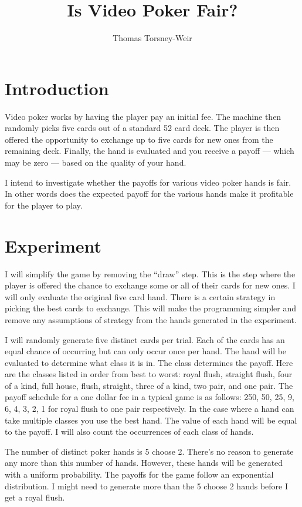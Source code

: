 \documentclass{article}
\author{Thomas Torsney-Weir}
\title{Is Video Poker Fair?}
\begin{document}
\maketitle

\section{Introduction}
Video poker works by having the player pay an initial fee.  The machine then
randomly picks five cards out of a standard 52 card deck.  The player is then 
offered the opportunity to exchange up to five cards for new ones from the
remaining deck.  Finally, the hand is evaluated and you receive a payoff 
--- which may be zero --- based on the quality of your hand.

I intend to investigate whether the payoffs for various video poker hands 
is fair.  In other words does the expected payoff for the various hands 
make it profitable for the player to play.

\section{Experiment}
I will simplify the game by removing the ``draw'' step.  This is the step
where the player is offered the chance to exchange some or all of their cards
for new ones.  I will only evaluate the original five card hand.  There is a
certain strategy in picking the best cards to exchange.  This will make the 
programming simpler and remove any assumptions of strategy from the hands 
generated in the experiment.

I will randomly generate five distinct cards per trial.  Each of the cards 
has an equal chance of occurring but can only occur once per hand.  The hand 
will be evaluated to determine what class it is in.  The class determines 
the payoff.  Here are the classes listed in order from best to worst: royal 
flush, straight flush, four of a kind, full house, flush, straight, three of 
a kind, two pair, and one pair.  The payoff schedule for a one dollar fee in a
typical game is as follows: 250, 50, 25, 9, 6, 4, 3, 2, 1 for royal flush to
one pair respectively.  In the case where a hand can take multiple 
classes you use the best hand.  The value of each hand will be equal to 
the payoff.  I will also count the occurrences of each class of hands.

The number of distinct poker hands is 5 choose 2.  There's no reason to 
generate any more than this number of hands.  However, these hands will 
be generated with a uniform probability.  The payoffs for the game follow
an exponential distribution.  I might need to generate more than the 5 choose
2 hands before I get a royal flush.  
\end{document}

